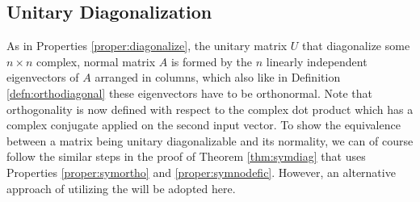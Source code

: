 \subsection{Unitary Diagonalization}

As in Properties \ref{proper:diagonalize}, the unitary matrix $U$ that diagonalize some $n \times n$ complex, normal matrix $A$ is formed by the $n$ linearly independent eigenvectors of $A$ arranged in columns, which also like in Definition \ref{defn:orthodiagonal} these eigenvectors have to be orthonormal. Note that orthogonality is now defined with respect to the complex dot product which has a complex conjugate applied on the second input vector. To show the equivalence between a matrix being unitary diagonalizable and its normality, we can of course follow the similar steps in the proof of Theorem \ref{thm:symdiag} that uses Properties \ref{proper:symortho} and \ref{proper:symnodefic}. However, an alternative approach of utilizing the  will be adopted here.

